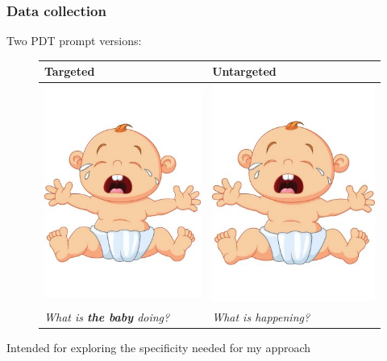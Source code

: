 \documentclass[xcolor={dvipsnames}]{beamer}
\begin{document}
\begin{frame}
\frametitle{Data collection}

Two PDT prompt versions:
\begin{figure}[htb!]
\begin{center}
\begin{tabular}{|C{50mm}|C{50mm}|}
\hline
\textbf{Targeted} & \textbf{Untargeted} \\
\hline
{\includegraphics[trim=0 50 0 50,clip,width=0.33\columnwidth]{figures/I10.jpg}} & {\includegraphics[trim=0 50 0 50,clip,width=0.33\columnwidth]{figures/I10.jpg}} \\
\hline
\textit{What is \textbf{the baby} doing?} & \textit{What is happening?} \\
\hline
\end{tabular}
\end{center}
\end{figure}

Intended for exploring the specificity needed for my approach

\end{frame}
\end{document}
